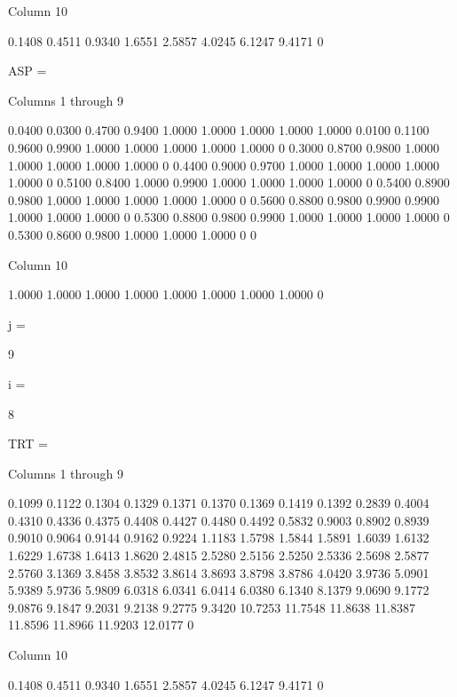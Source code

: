   Column 10

    0.1408
    0.4511
    0.9340
    1.6551
    2.5857
    4.0245
    6.1247
    9.4171
         0


ASP =

  Columns 1 through 9

    0.0400    0.0300    0.4700    0.9400    1.0000    1.0000    1.0000    1.0000    1.0000
    0.0100    0.1100    0.9600    0.9900    1.0000    1.0000    1.0000    1.0000    1.0000
         0    0.3000    0.8700    0.9800    1.0000    1.0000    1.0000    1.0000    1.0000
         0    0.4400    0.9000    0.9700    1.0000    1.0000    1.0000    1.0000    1.0000
         0    0.5100    0.8400    1.0000    0.9900    1.0000    1.0000    1.0000    1.0000
         0    0.5400    0.8900    0.9800    1.0000    1.0000    1.0000    1.0000    1.0000
         0    0.5600    0.8800    0.9800    0.9900    0.9900    1.0000    1.0000    1.0000
         0    0.5300    0.8800    0.9800    0.9900    1.0000    1.0000    1.0000    1.0000
         0    0.5300    0.8600    0.9800    1.0000    1.0000    1.0000         0         0

  Column 10

    1.0000
    1.0000
    1.0000
    1.0000
    1.0000
    1.0000
    1.0000
    1.0000
         0


j =

     9


i =

     8


TRT =

  Columns 1 through 9

    0.1099    0.1122    0.1304    0.1329    0.1371    0.1370    0.1369    0.1419    0.1392
    0.2839    0.4004    0.4310    0.4336    0.4375    0.4408    0.4427    0.4480    0.4492
    0.5832    0.9003    0.8902    0.8939    0.9010    0.9064    0.9144    0.9162    0.9224
    1.1183    1.5798    1.5844    1.5891    1.6039    1.6132    1.6229    1.6738    1.6413
    1.8620    2.4815    2.5280    2.5156    2.5250    2.5336    2.5698    2.5877    2.5760
    3.1369    3.8458    3.8532    3.8614    3.8693    3.8798    3.8786    4.0420    3.9736
    5.0901    5.9389    5.9736    5.9809    6.0318    6.0341    6.0414    6.0380    6.1340
    8.1379    9.0690    9.1772    9.0876    9.1847    9.2031    9.2138    9.2775    9.3420
   10.7253   11.7548   11.8638   11.8387   11.8596   11.8966   11.9203   12.0177         0

  Column 10

    0.1408
    0.4511
    0.9340
    1.6551
    2.5857
    4.0245
    6.1247
    9.4171
         0


